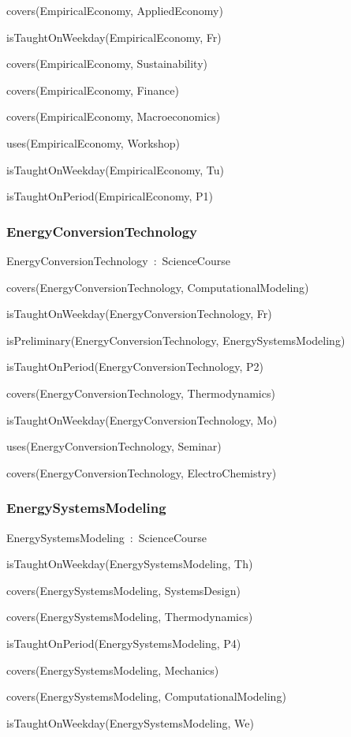 \documentclass{article}
\begin{document}
covers(EmpiricalEconomy, AppliedEconomy)

isTaughtOnWeekday(EmpiricalEconomy, Fr)

covers(EmpiricalEconomy, Sustainability)

covers(EmpiricalEconomy, Finance)

covers(EmpiricalEconomy, Macroeconomics)

uses(EmpiricalEconomy, Workshop)

isTaughtOnWeekday(EmpiricalEconomy, Tu)

isTaughtOnPeriod(EmpiricalEconomy, P1)

\subsubsection*{EnergyConversionTechnology}

EnergyConversionTechnology~:~ScienceCourse

covers(EnergyConversionTechnology, ComputationalModeling)

isTaughtOnWeekday(EnergyConversionTechnology, Fr)

isPreliminary(EnergyConversionTechnology, EnergySystemsModeling)

isTaughtOnPeriod(EnergyConversionTechnology, P2)

covers(EnergyConversionTechnology, Thermodynamics)

isTaughtOnWeekday(EnergyConversionTechnology, Mo)

uses(EnergyConversionTechnology, Seminar)

covers(EnergyConversionTechnology, ElectroChemistry)

\subsubsection*{EnergySystemsModeling}

EnergySystemsModeling~:~ScienceCourse

isTaughtOnWeekday(EnergySystemsModeling, Th)

covers(EnergySystemsModeling, SystemsDesign)

covers(EnergySystemsModeling, Thermodynamics)

isTaughtOnPeriod(EnergySystemsModeling, P4)

covers(EnergySystemsModeling, Mechanics)

covers(EnergySystemsModeling, ComputationalModeling)

isTaughtOnWeekday(EnergySystemsModeling, We)
\end{document}
